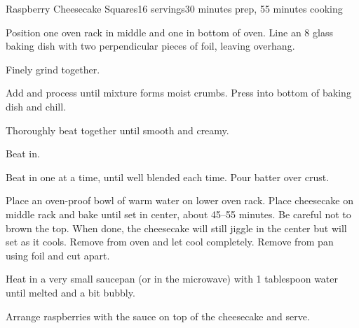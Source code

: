 \documentclass[../Cookbook.tex]{subfiles}
\begin{document}
\begin{recipe}{Raspberry Cheesecake Squares}{16 servings}{30 minutes prep, 55 minutes cooking}

Position one oven rack in middle and one in bottom of oven.  Line an 8 glass baking dish with two perpendicular pieces of foil, leaving overhang.

Finely grind together.

Add and process until mixture forms moist crumbs. Press into bottom of baking dish and chill.

Thoroughly beat together until smooth and creamy.

Beat in.

Beat in one at a time, until well blended each time. Pour batter over crust.

Place an oven-proof bowl of warm water on lower oven rack. Place cheesecake on middle rack and bake until set in center, about 45--55 minutes. Be careful not to brown the top.
When done, the cheesecake will still jiggle in the center but will set as it cools.
Remove from oven and let cool completely. Remove from pan using foil and cut apart.

Heat in a very small saucepan (or in the microwave) with 1 tablespoon water until melted and a bit bubbly.

Arrange raspberries with the sauce on top of the cheesecake and serve.

\end{recipe}
\end{document}
